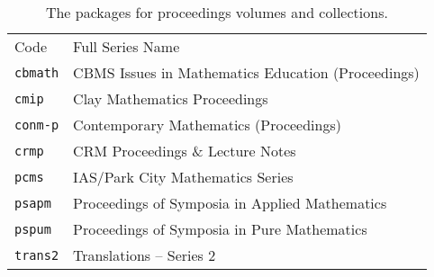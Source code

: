 
\begin{table}[h!]
\caption{The packages for proceedings volumes and collections.}\label{tbl:series}
{\small
\begin{tabular}{@{}lp{}}
Code & \hspace*{.75in}Full Series Name\\[.5pc]
\verb+cbmath+&   CBMS Issues in Mathematics Education (Proceedings)\\
\verb+cmip+&     Clay Mathematics Proceedings\\
\verb+conm-p+&   Contemporary Mathematics (Proceedings)\\
\verb+crmp+&     CRM Proceedings \& Lecture Notes\strut\\
\verb+pcms+&     IAS/Park City Mathematics Series\\
\verb+psapm+&    Proceedings of Symposia in Applied Mathematics\\
\verb+pspum+&    Proceedings of Symposia in Pure Mathematics\\
\verb+trans2+&	Translations -- Series 2\\
\end{tabular}
}
\end{table}
\endinput
